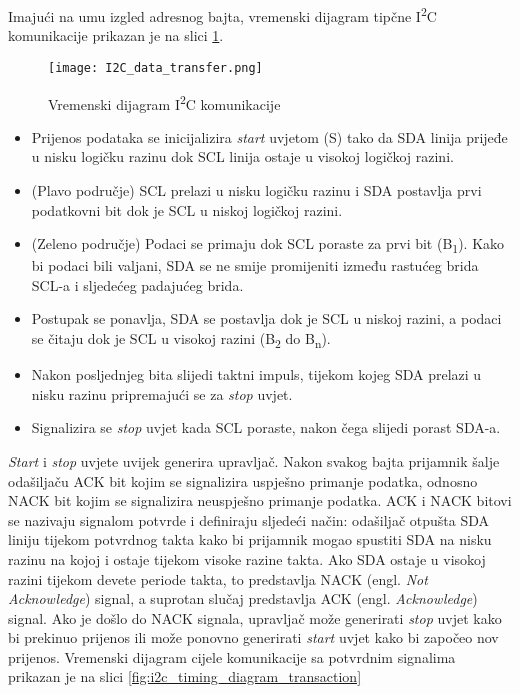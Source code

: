 Imajući na umu izgled adresnog bajta, vremenski dijagram tipčne I\textsuperscript{2}C komunikacije prikazan je na slici \ref{fig:i2c_timing_diagram}.
\begin{figure}[hp]
	\centering
	\texttt{[image: I2C\_data\_transfer.png]}
	\caption{Vremenski dijagram I\textsuperscript{2}C komunikacije
	\cite{i2c_wikipedia}}
	\label{fig:i2c_timing_diagram}
\end{figure}
\begin{itemize}
	\item Prijenos podataka se inicijalizira \textit{start} uvjetom (S) tako da
	SDA linija prijeđe u nisku logičku razinu dok SCL linija ostaje u visokoj
	logičkoj razini.
	\item (Plavo područje) SCL prelazi u nisku logičku razinu i SDA postavlja
	prvi podatkovni bit dok je SCL u niskoj logičkoj razini.
	\item (Zeleno područje) Podaci se primaju dok SCL poraste za prvi bit
	(B\textsubscript{1}). Kako bi podaci bili valjani, SDA se ne smije
	promijeniti između rastućeg brida SCL-a i sljedećeg padajućeg brida.
	\item Postupak se ponavlja, SDA se postavlja dok je SCL u niskoj razini, a
	podaci se čitaju dok je SCL u visokoj razini (B\textsubscript{2} do
	B\textsubscript{n}).
	\item Nakon posljednjeg bita slijedi taktni impuls, tijekom kojeg SDA
	prelazi u nisku razinu pripremajući se za \textit{stop} uvjet.
	\item Signalizira se \textit{stop} uvjet kada SCL poraste, nakon čega
	slijedi porast SDA-a.
\end{itemize}
\textit{Start} i \textit{stop} uvjete uvijek generira upravljač.
Nakon svakog bajta prijamnik šalje odašiljaču ACK bit kojim se signalizira uspješno primanje podatka, odnosno NACK bit kojim se signalizira neuspješno primanje podatka. ACK i NACK bitovi se nazivaju signalom potvrde i definiraju sljedeći način: odašiljač otpušta SDA liniju tijekom potvrdnog takta kako bi prijamnik mogao spustiti SDA na nisku razinu na kojoj i ostaje tijekom visoke razine takta. Ako SDA ostaje u visokoj razini tijekom devete periode takta, to predstavlja NACK (engl. \textit{Not Acknowledge}) signal, a suprotan slučaj predstavlja ACK (engl. \textit{Acknowledge}) signal. Ako je došlo do NACK signala, upravljač može generirati \textit{stop} uvjet kako bi prekinuo prijenos ili može ponovno generirati \textit{start} uvjet kako bi započeo nov prijenos. Vremenski dijagram cijele komunikacije sa potvrdnim signalima prikazan je na slici \ref{fig:i2c_timing_diagram_transaction}


